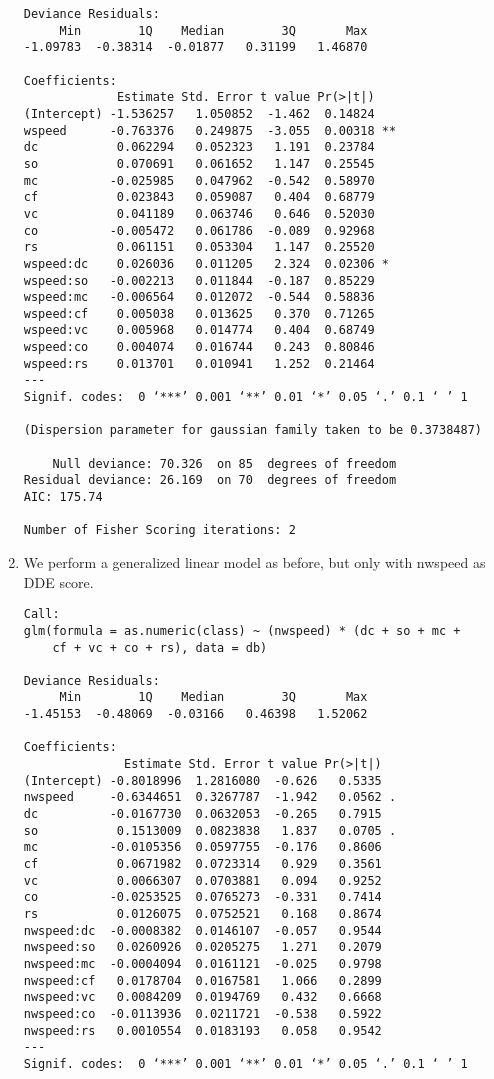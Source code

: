 \documentclass[11pt, a4paper, twoside, openright]{article}
\begin{document}
\begin{enumerate}
\begin{verbatim}
Deviance Residuals: 
     Min        1Q    Median        3Q       Max  
-1.09783  -0.38314  -0.01877   0.31199   1.46870  

Coefficients:
             Estimate Std. Error t value Pr(>|t|)   
(Intercept) -1.536257   1.050852  -1.462  0.14824   
wspeed      -0.763376   0.249875  -3.055  0.00318 **
dc           0.062294   0.052323   1.191  0.23784   
so           0.070691   0.061652   1.147  0.25545   
mc          -0.025985   0.047962  -0.542  0.58970   
cf           0.023843   0.059087   0.404  0.68779   
vc           0.041189   0.063746   0.646  0.52030   
co          -0.005472   0.061786  -0.089  0.92968   
rs           0.061151   0.053304   1.147  0.25520   
wspeed:dc    0.026036   0.011205   2.324  0.02306 * 
wspeed:so   -0.002213   0.011844  -0.187  0.85229   
wspeed:mc   -0.006564   0.012072  -0.544  0.58836   
wspeed:cf    0.005038   0.013625   0.370  0.71265   
wspeed:vc    0.005968   0.014774   0.404  0.68749   
wspeed:co    0.004074   0.016744   0.243  0.80846   
wspeed:rs    0.013701   0.010941   1.252  0.21464   
---
Signif. codes:  0 ‘***’ 0.001 ‘**’ 0.01 ‘*’ 0.05 ‘.’ 0.1 ‘ ’ 1

(Dispersion parameter for gaussian family taken to be 0.3738487)

    Null deviance: 70.326  on 85  degrees of freedom
Residual deviance: 26.169  on 70  degrees of freedom
AIC: 175.74

Number of Fisher Scoring iterations: 2
\end{verbatim}
\item We perform a generalized linear model as before, but only with
  nwspeed as DDE score.
\begin{verbatim}
Call:
glm(formula = as.numeric(class) ~ (nwspeed) * (dc + so + mc + 
    cf + vc + co + rs), data = db)

Deviance Residuals: 
     Min        1Q    Median        3Q       Max  
-1.45153  -0.48069  -0.03166   0.46398   1.52062  

Coefficients:
              Estimate Std. Error t value Pr(>|t|)  
(Intercept) -0.8018996  1.2816080  -0.626   0.5335  
nwspeed     -0.6344651  0.3267787  -1.942   0.0562 .
dc          -0.0167730  0.0632053  -0.265   0.7915  
so           0.1513009  0.0823838   1.837   0.0705 .
mc          -0.0105356  0.0597755  -0.176   0.8606  
cf           0.0671982  0.0723314   0.929   0.3561  
vc           0.0066307  0.0703881   0.094   0.9252  
co          -0.0253525  0.0765273  -0.331   0.7414  
rs           0.0126075  0.0752521   0.168   0.8674  
nwspeed:dc  -0.0008382  0.0146107  -0.057   0.9544  
nwspeed:so   0.0260926  0.0205275   1.271   0.2079  
nwspeed:mc  -0.0004094  0.0161121  -0.025   0.9798  
nwspeed:cf   0.0178704  0.0167581   1.066   0.2899  
nwspeed:vc   0.0084209  0.0194769   0.432   0.6668  
nwspeed:co  -0.0113936  0.0211721  -0.538   0.5922  
nwspeed:rs   0.0010554  0.0183193   0.058   0.9542  
---
Signif. codes:  0 ‘***’ 0.001 ‘**’ 0.01 ‘*’ 0.05 ‘.’ 0.1 ‘ ’ 1


\end{verbatim}
\end{enumerate}
\end{document}
